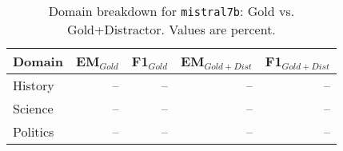 \begin{table}[t]\centering
\caption{Domain breakdown for \texttt{mistral7b}: Gold vs. Gold+Distractor. Values are percent.}
\label{tab:domain-mistral7b}
\begin{tabular}{lrrrr}
\toprule
Domain & EM$_{Gold}$ & F1$_{Gold}$ & EM$_{Gold+Dist}$ & F1$_{Gold+Dist}$ \\
\midrule
History & -- & -- & -- & -- \\
Science & -- & -- & -- & -- \\
Politics & -- & -- & -- & -- \\
\bottomrule
\end{tabular}
\end{table}


